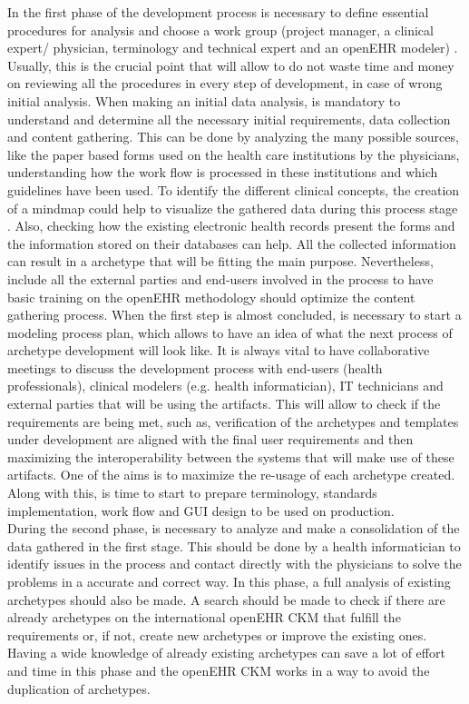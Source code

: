 \documentclass[mim_thesis.tex]{subfiles}
\begin{document}
In the first phase of the development process is necessary to define essential procedures for analysis and choose a work group (project manager, a clinical expert/ physician, terminology and technical expert and an openEHR modeler) \citep{moner2018archetype}. Usually, this is the crucial point that will allow to do not waste time and money on reviewing all the procedures in every step of development, in case of wrong initial analysis. When making an initial data analysis, is mandatory to understand and determine all the necessary initial requirements, data collection and content gathering. This can be done by analyzing the many possible sources, like the paper based forms used on the health care institutions by the physicians, understanding how the work flow is processed in these institutions and which guidelines have been used. To identify the different clinical concepts, the creation of a mindmap could help to visualize the gathered data during this process stage \citep{marcos2010towards}. Also, checking how the existing electronic health records present the forms and the information stored on their databases can help. All the collected information can result in a archetype that will be fitting the main purpose. Nevertheless, include all the external parties and end-users involved in the process to have basic training on the openEHR methodology should optimize the content gathering process. When the first step is almost concluded, is necessary to start a modeling process plan, which allows to have an idea of what the next process of archetype development will look like. It is always vital to have collaborative meetings to discuss the development process with end-users (health professionals), clinical modelers (e.g. health informatician), IT technicians and external parties that will be using the artifacts. This will allow to check if the requirements are being met, such as, verification of the archetypes and templates under development are aligned with the final user requirements and then maximizing the interoperability between the systems that will make use of these artifacts. One of the aims is to maximize the re-usage of each archetype created. Along with this, is time to start to prepare terminology, standards implementation, work flow and \ac{GUI} design to be used on production. \\

During the second phase, is necessary to analyze and make a consolidation of the data gathered in the first stage. This should be done by a health informatician to identify issues in the process and contact directly with the physicians to solve the problems in a accurate and correct way. In this phase, a full analysis of existing archetypes should also be made. A search should be made to check if there are already archetypes on the international openEHR CKM that fulfill the requirements or, if not, create new archetypes or improve the existing ones. Having a wide knowledge of already existing archetypes can save a lot of effort and time in this phase and the openEHR CKM works in a way to avoid the duplication of archetypes. \\
\end{document}
